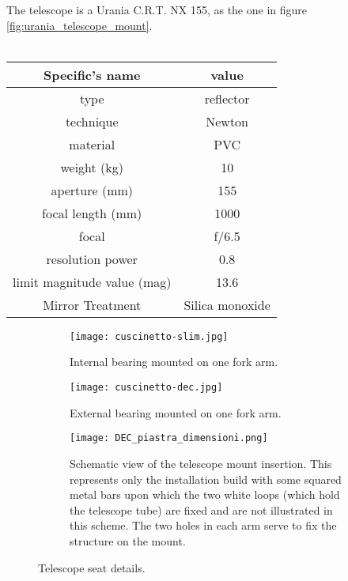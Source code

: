 The telescope is a Urania C.R.T. NX 155, as the one in figure \ref{fig:urania_telescope_mount}.
\\
\\
\begin{minipage}{0.5\textwidth}
    \centering
    \begin{tabular}{c|c}
        \hline
        \textbf{Specific's name} & \textbf{value} \\
        \hline
        type & reflector \\
        technique & Newton  \\
        material & PVC  \\
        weight (kg) & 10 \\
        aperture (mm) & 155 \\
        focal length (mm) & 1000 \\
        focal & f/6.5 \\
        resolution power & 0.8 \\
        limit magnitude value (mag) & 13.6 \\
        Mirror Treatment & Silica monoxide \\
        \hline
    \end{tabular}
\end{minipage}

\begin{figure*}
    \begin{subfigure}[t!]{.23\textwidth}
        \centering
        \texttt{[image: cuscinetto-slim.jpg]}
        \caption{Internal bearing mounted on one fork arm.}
        \label{fig:cuscinetto-slim}
    \end{subfigure}
    \begin{subfigure}[t!]{.23\textwidth}
        \centering
        \texttt{[image: cuscinetto-dec.jpg]}
        \caption{External bearing mounted on one fork arm.}
        \label{fig:cuscinetto-DEC}
    \end{subfigure}
    \begin{subfigure}[t!]
        {0.5\textwidth}
        \centering
        \texttt{[image: DEC\_piastra\_dimensioni.png]}
        \caption{Schematic view of the telescope mount insertion.
        This represents only the installation build with some squared metal bars upon which the two white loops (which hold the telescope tube) are fixed and are not illustrated in this scheme. The two holes in each arm serve to fix the structure on the mount. }
        \label{fig:DEC_piastra_dimensioni}
    \end{subfigure}
    \caption{Telescope seat details.}
    \label{fig:telescope-substitution}
\end{figure*}

